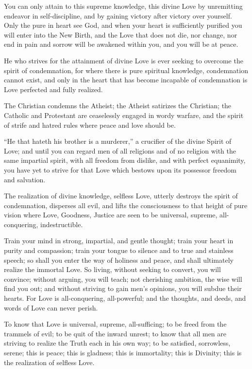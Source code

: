\documentclass[12pt,oneside]{scrbook}
\begin{document}
  You can only attain to this supreme knowledge, this divine Love by
  unremitting endeavor in self-discipline, and by gaining victory after
  victory over yourself. Only the pure in heart see God, and when your
  heart is sufficiently purified you will enter into the New Birth, and
  the Love that does not die, nor change, nor end in pain and sorrow will
  be awakened within you, and you will be at peace.
  
  He who strives for the attainment of divine Love is ever seeking to
  overcome the spirit of condemnation, for where there is pure spiritual
  knowledge, condemnation cannot exist, and only in the heart that has
  become incapable of condemnation is Love perfected and fully realized.
  
  The Christian condemns the Atheist; the Atheist satirizes the Christian;
  the Catholic and Protestant are ceaselessly engaged in wordy warfare,
  and the spirit of strife and hatred rules where peace and love should
  be.
  
  ``He that hateth his brother is a murderer,'' a crucifier of the divine
  Spirit of Love; and until you can regard men of all religions and of no
  religion with the same impartial spirit, with all freedom from dislike,
  and with perfect equanimity, you have yet to strive for that Love which
  bestows upon its possessor freedom and salvation.
  
  The realization of divine knowledge, selfless Love, utterly destroys the
  spirit of condemnation, disperses all evil, and lifts the consciousness
  to that height of pure vision where Love, Goodness, Justice are seen to
  be universal, supreme, all-conquering, indestructible.
  
  Train your mind in strong, impartial, and gentle thought; train your
  heart in purity and compassion; train your tongue to silence and to true
  and stainless speech; so shall you enter the way of holiness and peace,
  and shall ultimately realize the immortal Love. So living, without
  seeking to convert, you will convince; without arguing, you will teach;
  not cherishing ambition, the wise will find you out; and without
  striving to gain men's opinions, you will subdue their hearts. For Love
  is all-conquering, all-powerful; and the thoughts, and deeds, and words
  of Love can never perish.
  
  To know that Love is universal, supreme, all-sufficing; to be freed from
  the trammels of evil; to be quit of the inward unrest; to know that all
  men are striving to realize the Truth each in his own way; to be
  satisfied, sorrowless, serene; this is peace; this is gladness; this is
  immortality; this is Divinity; this is the realization of selfless Love.
  
\end{document}

